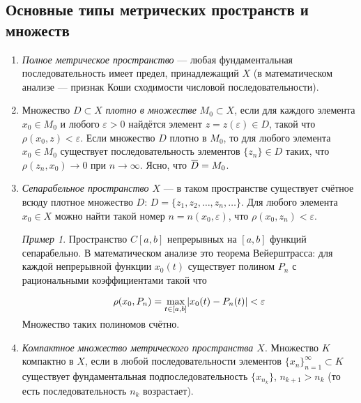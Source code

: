 \documentclass[12pt,a4paper,titlepage,oneside]{book}
\newcommand{\overbar}[1]{\mkern 1.5mu\overline{\mkern-1.5mu#1\mkern-1.5mu}\mkern 1.5mu}
\theoremstyle{definition}
\theoremstyle{plain}
\theoremstyle{break}
\theoremstyle{remark}
\theoremstyle{remark}
\newtheorem*{example}{Пример}
\theoremstyle{remark}
\theoremstyle{remark}
\theoremstyle{plain}
\theoremstyle{plain}
\begin{document}
\subsection*{Основные типы метрических пространств и множеств}

\begin{enumerate}

	\item \textit{Полное метрическое пространство} --- любая фундаментальная последовательность имеет предел, принадлежащий $X$ (в математическом анализе --- признак Коши сходимости числовой последовательности).

	\item Множество $D \subset X$ \textit{плотно в множестве} $ M_0 \subset X$, если для каждого элемента $x_0 \in M_0$ и любого $\varepsilon > 0$ найдётся элемент $z = z(\varepsilon) \in D$, такой что $\rho(x_0, z) < \varepsilon$. Если множество $D$ плотно в $M_0$, то для любого элемента $x_0 \in  M_0$ существует последовательность элементов $\lbrace z_n \rbrace \in D$ таких, что $\rho(z_n, x_0) \to 0$ при $n \to \infty$. Ясно, что $\overbar{D} = M_0$.

	\item \textit{Сепарабельное пространство $X$} --- в таком пространстве существует счётное всюду плотное множество $D$: $D=\lbrace z_1,z_2,\ldots,z_n,\ldots \rbrace$. Для любого элемента $x_0 \in X$ можно найти такой номер $n = n(x_0,\varepsilon)$, что $\rho(x_0, z_n) < \varepsilon$.

	\begin{example}	
	Пространство $C[a,b]$ непрерывных на $[a,b]$ функций сепарабельно. В математическом анализе это теорема Вейерштрасса: для каждой непрерывной функции $x_0(t)$ существует полином $P_n$ с рациональными коэффициентами такой что
	
	\begin{equation*}
	\rho(x_0, P_n)=\smash{\displaystyle\max_{t \in [a,b]}} |x_0(t)-P_n(t)| < \varepsilon
	\end{equation*}

	Множество таких полиномов счётно.
	\end{example}

	\item \textit{Компактное множество метрического пространства $X$}. Множество $K$ компактно в $X$, если в любой последовательности элементов $\lbrace x_n \rbrace_{n=1}^{\infty} \subset K$ существует фундаментальная подпоследовательность $\lbrace x_{n_k} \rbrace$, $n_{k+1}>n_k$ (то есть последовательность $n_k$ возрастает).

\end{enumerate}
\end{document}
